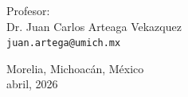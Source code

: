 \documentclass[
  english,
  spanish,
  12pt,
  oneside]{article}
\makeatletter
\def\cleardoublepage{\clearpage\if@twoside \ifodd\c@page\else
  \hbox{}
  \vspace*{\fill}
  \begin{center}
  \end{center}
  \vspace{\fill}
  \thispagestyle{empty}
  \newpage
  \if@twocolumn\hbox{}\newpage\fi\fi\fi}
\numberwithin{equation}{section}
\theoremstyle{plain}
\theoremstyle{definition}
\theoremstyle{remark}
\renewcommand*\contentsname{Tabla de contenidos}
\newcommand\contentsname{Tabla de contenidos}
\makeatother
\begin{document}
\begin{titlepage}
\begin{center}
\begin{center}
\bigskip

Profesor: \\
Dr. Juan Carlos Arteaga Vekazquez\\
\texttt{juan.artega@umich.mx}
\end{center}

\vfill

\begin{center}
{Morelia, Michoacán, México}\\
{abril, 2026}
\end{center}
\cleardoublepage
\end{center}
\end{titlepage}

\renewcommand*\contentsname{Tabla de contenidos}
{
\hypersetup{linkcolor=}
\setcounter{tocdepth}{3}
\tableofcontents
}
\listoffigures
\listoftables
\end{document}
